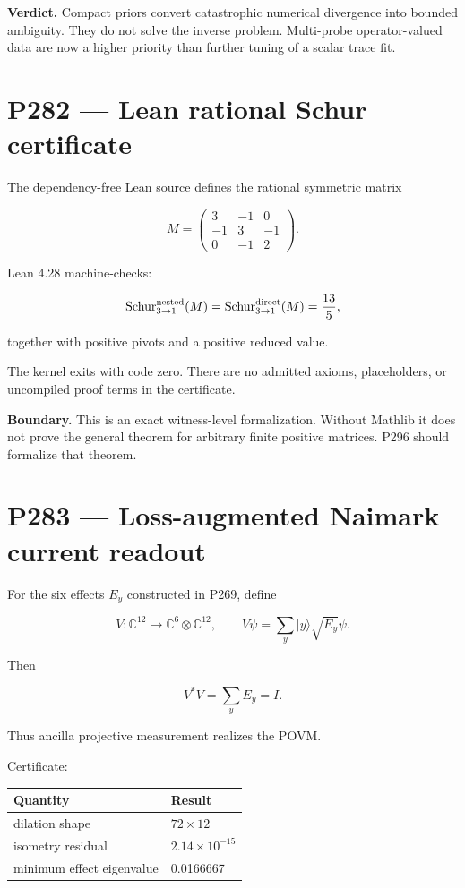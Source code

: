 \documentclass[11pt,a4paper,openany]{report}
\begin{document}
\textbf{Verdict.} Compact priors convert catastrophic numerical divergence into bounded ambiguity. They do not solve the inverse problem. Multi-probe operator-valued data are now a higher priority than further tuning of a scalar trace fit.

\chapter{P282 --- Lean rational Schur certificate}

The dependency-free Lean source defines the rational symmetric matrix

\[
M=
\begin{pmatrix}
3&-1&0\\
-1&3&-1\\
0&-1&2
\end{pmatrix}.
\]

Lean 4.28 machine-checks:

\[
\operatorname{Schur}_{3\to1}^{\rm nested}(M)
=
\operatorname{Schur}_{3\to1}^{\rm direct}(M)
=
\frac{13}{5},
\]

together with positive pivots and a positive reduced value.

The kernel exits with code zero. There are no admitted axioms, placeholders, or uncompiled proof terms in the certificate.

\textbf{Boundary.} This is an exact witness-level formalization. Without Mathlib it does not prove the general theorem for arbitrary finite positive matrices. P296 should formalize that theorem.

\chapter{P283 --- Loss-augmented Naimark current readout}

For the six effects \(E_y\) constructed in P269, define

\[
V:\mathbb C^{12}\to\mathbb C^6\otimes\mathbb C^{12},
\qquad
V\psi=\sum_y |y\rangle\sqrt{E_y}\psi.
\]

Then

\[
V^\ast V=\sum_yE_y=I.
\]

Thus ancilla projective measurement realizes the POVM.

Certificate:

\begin{center}
\begingroup\small
\setlength{\tabcolsep}{2.5pt}
\renewcommand{\arraystretch}{1.16}
\begin{longtable}{@{}p{}p{}@{}}
\toprule
\textbf{Quantity} & \textbf{Result} \\
\midrule
\endhead
dilation shape & \(72\times12\) \\
isometry residual & \(2.14\times10^{-15}\) \\
minimum effect eigenvalue & 0.0166667 \\
\bottomrule
\end{longtable}
\endgroup
\end{center}
\end{document}
